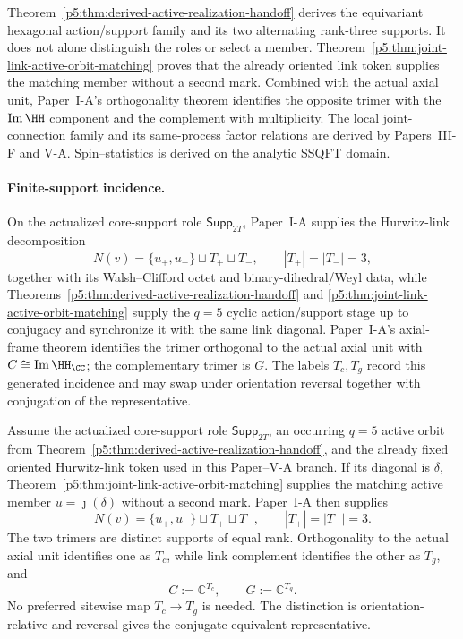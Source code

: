 \documentclass[12pt,a4paper]{article}
\begin{document}
\begin{remark}
Theorem~\ref{p5:thm:derived-active-realization-handoff} derives the
equivariant hexagonal action/support family and its two alternating rank-three
supports.  It does not alone distinguish the roles or select a member.
Theorem~\ref{p5:thm:joint-link-active-orbit-matching} proves that the already
oriented link token supplies the matching member without a second mark.
Combined with the actual axial unit,
Paper~I-A's orthogonality theorem identifies the opposite trimer with the
\(\operatorname{Im}\HH\) component and the complement with multiplicity.
The local joint-connection family and its same-process factor relations are
derived by Papers~III-F and V-A.  Spin--statistics is
derived on the analytic SSQFT domain.
\end{remark}

\paragraph{Finite-support incidence.}
On the actualized core-support role \(\mathsf{Supp}_{2T}\), Paper~I-A supplies
the Hurwitz-link
decomposition
\[
N(v)=\{u_+,u_-\}\sqcup T_+\sqcup T_-,
\qquad |T_+|=|T_-|=3,
\]
together with its Walsh--Clifford octet and binary-dihedral/Weyl data, while
Theorems~\ref{p5:thm:derived-active-realization-handoff} and
\ref{p5:thm:joint-link-active-orbit-matching} supply the \(q=5\) cyclic
action/support stage up to conjugacy and synchronize it with the same link
diagonal.
Paper~I-A's axial-frame theorem identifies the trimer orthogonal to the actual
axial unit with \(C\cong\operatorname{Im}\HH_\CC\); the complementary trimer
is \(G\).  The labels \(T_c,T_g\) record this generated incidence and may swap
under orientation reversal together with conjugation of the representative.

\begin{theorem}
\label{p5:thm:hurwitz-link-support-import}
Assume the actualized core-support role \(\mathsf{Supp}_{2T}\), an occurring
\(q=5\) active orbit from
Theorem~\ref{p5:thm:derived-active-realization-handoff}, and the already fixed
oriented Hurwitz-link token used in this Paper--V-A branch.  If its diagonal is
\(\delta\), Theorem~\ref{p5:thm:joint-link-active-orbit-matching} supplies the
matching active member \(u=\jmath(\delta)\) without a second mark.  Paper~I-A then supplies
\[
N(v)=\{u_+,u_-\}\sqcup T_+\sqcup T_-,
\qquad |T_+|=|T_-|=3.
\]
The two trimers are distinct supports of equal rank.  Orthogonality to the
actual axial unit identifies one as \(T_c\), while link complement identifies
the other as \(T_g\), and
\begin{equation}
\label{p5:eq:two-trimer-supports}
C:=\mathbb C^{T_c},
\qquad
G:=\mathbb C^{T_g}.
\end{equation}
No preferred sitewise map \(T_c\to T_g\) is needed.  The distinction is
orientation-relative and reversal gives the conjugate equivalent
representative.
\end{theorem}
\end{document}
